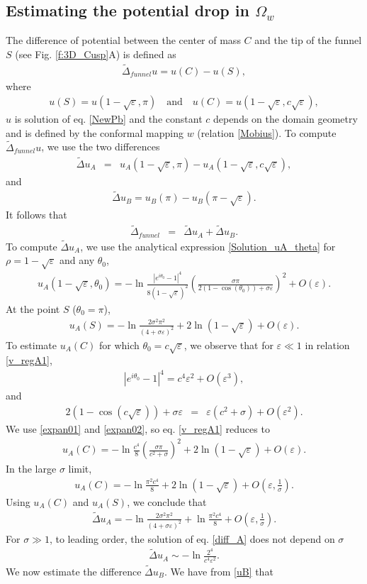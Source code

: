 \documentclass[12pt]{article}
\newcommand{\beq}{\begin{eqnarray}}
\newcommand{\eeq}{\end{eqnarray}}
\newcommand{\eps}{\varepsilon}
\begin{document}
\subsection{Estimating the potential drop in $\Omega_w$}
The difference of potential between the center of mass $C$ and the tip of the funnel $S$ (see Fig. \ref{f:3D_Cusp}A) is defined as
\beq
\tilde\Delta_{funnel} u=u(C)-u(S),
\eeq
where
\beq
u(S)=u(1-\sqrt{\eps},\pi)\quad\mbox{and}\quad u(C)=u(1-\sqrt{\eps},c\sqrt{\eps}),
\eeq
$u$ is solution of eq. \ref{NewPb} and the constant $c$ depends on the domain geometry  and is defined by the conformal mapping $w$ (relation \eqref{Mobius}). To compute $\tilde \Delta_{funnel} u$, we use the two differences
\beq\label{diff_A_exp}
\tilde\Delta u_A &=&u_A(1-\sqrt{\eps},\pi) -u_A(1-\sqrt{\eps},c\sqrt{\eps}),
\eeq
and
\beq\label{diff_B_exp}
\tilde \Delta u_{B}=u_B (\pi)-u_B (\pi-\sqrt{\eps}).
\eeq
It follows that
\beq\label{D_unif}
\tilde \Delta_{funnel} &=& \tilde \Delta u_{A}+\tilde \Delta u_{B}.
\eeq
To compute $\tilde \Delta u_{A}$, we use the analytical expression \eqref{Solution_uA_theta} for $\rho=1-\sqrt{\eps}$ and any $\theta_0$,
\beq\label{v_regA1}
u_{A}(1-\sqrt{\eps},\theta_0)=-\ln\frac{|e^{i\theta_0}-1|^4}{8(1-\sqrt{\eps})^2}
\left(\frac{\sigma\pi}{2 (1-\cos(\theta_0))+\sigma\eps}\right)^2+O(\eps).
\eeq
At the point $S$ ($\theta_0=\pi$),
\beq\label{solution4pi_v1}
u_A(S)=-\ln\frac{2\sigma^2\pi^2}{(4 +\sigma\eps)^2} +2\ln(1-\sqrt{\eps})+O(\eps).
\eeq
To estimate $u_A(C)$ for which $\theta_0=c\sqrt{\eps}$, we observe that for $\eps\ll1$ in relation \eqref{v_regA1},
\beq\label{expan01}
|e^{i\theta_0}-1|^4=c^4\eps^2+O(\eps^3),
\eeq
and
\beq\label{expan02}
2(1-\cos (c\sqrt{\eps}))+\sigma\eps&=&\eps( c^2+\sigma)+O(\eps^2).
\eeq
We use \eqref{expan01} and \eqref{expan02}, so eq. \eqref{v_regA1} reduces to
\beq\label{solution4c_v0}
u_A(C)={-\ln \frac{c^4} {8}  \left(\frac{\sigma\pi}{ c^2+\sigma} \right)^2}+2\ln(1-\sqrt{\eps})+O\left(\eps\right).
\eeq
In the large $\sigma$ limit,
\beq\label{solution4c_v1}
u_A(C)={-\ln \frac{\pi^2c^4}{8}}+2\ln(1-\sqrt{\eps})+O\left(\eps,\frac{1}{\sigma}\right).
\eeq
Using $u_A(C)$ and $u_A(S)$, we conclude that
\beq\label{diff_A}
\tilde\Delta u_A =-\ln\frac{2\sigma^2\pi^2}{(4 +\sigma\eps)^2}+\ln\frac{\pi^2c^4}{8} +O\left(\eps,\frac{1}{\sigma}\right).
\eeq
For $\sigma\gg1$, to leading order, the solution of eq. \eqref{diff_A} does not depend on $\sigma$
\beq\label{Diff_A_large}
\tilde \Delta u_A\sim{-\ln\frac{2^4}{c^4\eps^2}}.
\eeq
We now estimate the difference $ \tilde\Delta u_{B}$. We have from \eqref{uB} that
\end{document}
